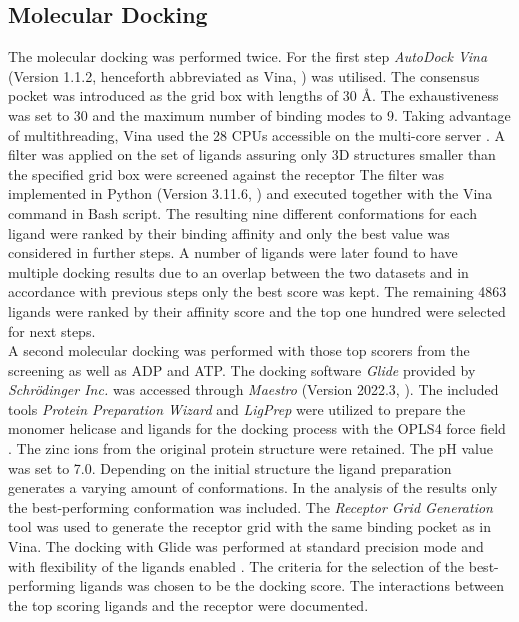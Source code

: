 \documentclass[11pt, letterpaper, titlepage]{article}
\renewcommand{\cite}{\parencite}
\begin{document}
\subsection{Molecular Docking}
The molecular docking was performed twice. 
For the first step \textit{AutoDock Vina} (Version 1.1.2, henceforth abbreviated as Vina, \textcite{Trott.2010}) was utilised. 
The consensus pocket was introduced as the grid box with lengths of 30 \AA. The exhaustiveness was set to 30 and the maximum number of binding modes to 9. Taking advantage of multithreading, \ac{Vina} used the 28 CPUs accessible on the multi-core server \cite{Che2023}. A filter was applied on the set of ligands assuring only 3D structures smaller than the specified grid box were screened against the receptor 
The filter was implemented in Python (Version 3.11.6, \textcite{Python}) and executed together with the Vina command in Bash script. The resulting nine different conformations for each ligand were ranked by their binding affinity and only the best value was considered in further steps. A number of ligands were later found to have multiple docking results due to an overlap between the two datasets and in accordance with previous steps only the best score was kept. The remaining 4863 ligands were ranked by their affinity score and the top one hundred were selected for next steps. \\
A second molecular docking was performed with those top scorers from the screening as well as \ac{ADP} and \ac{ATP}. The docking software \textit{Glide} provided by \textit{Schrödinger Inc.} \cite{Friesner2004} was accessed through \textit{Maestro} (Version 2022.3, \textcite{Maestro2022}). The included tools \textit{Protein Preparation Wizard} and \textit{LigPrep} \cite{Madhavi2013} were utilized to prepare the monomer helicase and ligands for the docking process with the OPLS4 force field \cite{Lu2021}. The zinc ions from the original protein structure were retained. The pH value was set to 7.0. Depending on the initial structure the ligand preparation generates a varying amount of conformations. In the analysis of the results only the best-performing conformation was included. The \textit{Receptor Grid Generation} tool was used to generate the receptor grid with the same binding pocket as in Vina. The docking with Glide was performed at standard precision mode and with flexibility of the ligands enabled \cite{Halgren.2004}. The criteria for the selection of the best-performing ligands was chosen to be the docking score. The interactions between the top scoring ligands and the receptor were documented. 
\end{document}
